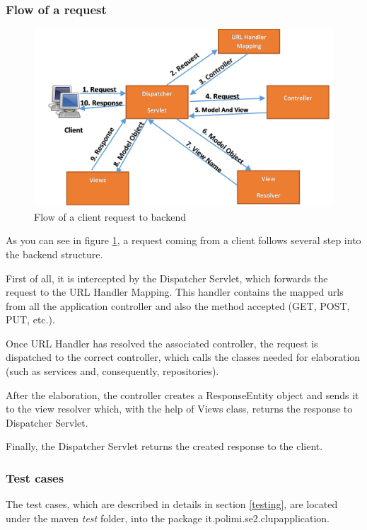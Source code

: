 \documentclass[table, 12pt]{article}
\begin{document}
\subsubsection{Flow of a request}
\begin{figure}[H]
    \includegraphics[width=\textwidth]{assets/Spring-MVC-Flow-Diagram.jpg}
    \caption{Flow of a client request to backend}
    \label{spring_mvc_request}
\end{figure}
As you can see in figure \ref{spring_mvc_request}, a request coming from a client follows several step into the backend structure.

First of all, it is intercepted by the Dispatcher Servlet, which forwards the request to the URL Handler Mapping. This handler contains the mapped urls from all the application controller and also the method accepted (GET, POST, PUT, etc.).

Once URL Handler has resolved the associated controller, the request is dispatched to the correct controller, which calls the classes needed for elaboration (such as services and, consequently, repositories).

After the elaboration, the controller creates a ResponseEntity object and sends it to the view resolver which, with the help of Views class, returns the response to Dispatcher Servlet.

Finally, the Dispatcher Servlet returns the created response to the client.

\subsubsection{Test cases}
The test cases, which are described in details in section \ref{testing}, are located under the maven \textit{test} folder, into the package it.polimi.se2.clupapplication.
\end{document}
